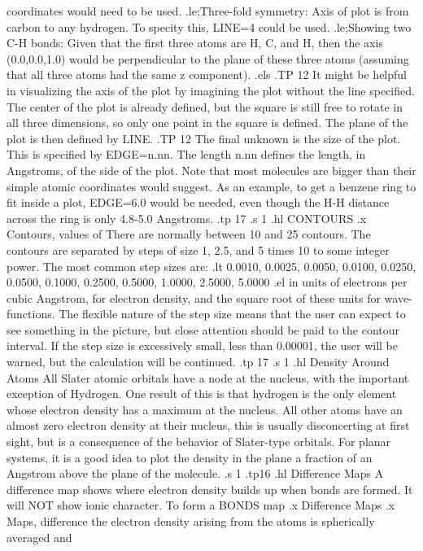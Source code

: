 coordinates would need to be used.
.le;Three-fold symmetry: Axis of plot is from carbon to any hydrogen.
To specity this, LINE=4 could be used.
.le;Showing two C-H bonds: Given that the first three atoms are H, C, and
H, then the axis (0.0,0.0,1.0) would be perpendicular to the plane
of  these three atoms (assuming that all three atoms had the same z component).
.els
.TP 12
 It might be helpful in visualizing the axis of the plot by imagining the plot
without the line specified. The center of the plot is already defined, but
the square is still free to rotate in all three dimensions, so only one
point in the square is defined. The plane of the plot is then defined by LINE.
.TP 12
 The final unknown is the size of the plot. This is specified by EDGE=n.nn.
The length n.nn defines the length, in Angstroms, of the side of the plot.
Note that most molecules are bigger than their simple atomic coordinates
would suggest. As an example, to get a benzene ring to fit inside a plot,
EDGE=6.0 would be needed, even though the H-H distance across the ring is
only 4.8-5.0 Angstroms.
.tp 17
.s 1
.hl CONTOURS
.x Contours, values of
 There are normally between 10 and 25 contours. The contours are separated
by steps of size 1, 2.5, and 5 times 10 to some integer power. The most
common step sizes are:
.lt
 0.0010, 0.0025, 0.0050, 0.0100, 0.0250, 0.0500, 
 0.1000, 0.2500, 0.5000, 1.0000, 2.5000, 5.0000
.el
in units of electrons per cubic Angstrom, for electron density, and
the square root of these units for wave-functions.
 The flexible nature of the step size means that the user can expect to see
something in the picture, but close attention should be paid to the contour
interval. If the step size is excessively small, less than 0.00001, 
the user will be warned, but the calculation will be continued.
.tp 17
.s 1
.hl Density Around Atoms
 All Slater atomic orbitals have a node at the nucleus, with the important exception
of Hydrogen. One result of this is that hydrogen is the only element whose
electron density has a maximum at the nucleus. All other atoms have an almost
zero electron density at their nucleus, this is usually disconcerting 
at first sight,
but is a consequence of the behavior of Slater-type orbitals.
 For planar systems, it is a good idea to plot the density in the plane
a fraction of an Angstrom above the plane of the molecule.
.s 1
.tp16
.hl Difference Maps
 A difference map shows where electron density builds up when bonds are
formed. It will NOT show ionic character. To form a BONDS map
.x Difference Maps
.x Maps, difference
the electron density arising from the atoms is spherically averaged and
